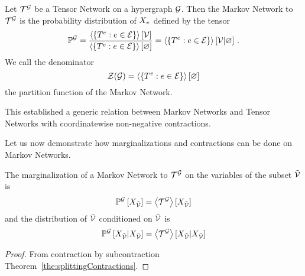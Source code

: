 \begin{definition}\label{def:markovNetwork}
	Let $\mathcal{T}^{\mathcal{G}}$ be a Tensor Network on a hypergraph $\mathcal{G}$.
	Then the Markov Network to $\mathcal{T}^{\mathcal{G}}$ is the probability distribution of $X_{v}$ defined by the tensor
		\[ \mathbb{P}^{\mathcal{G}} = \frac{
			\left\langle \{T^{e} : e \in \mathcal{E}\}\right\rangle \left[ \mathcal{V} \right] 
		}{
			\left\langle \{T^{e} : e \in \mathcal{E}\}\right\rangle \left[ \varnothing \right]
		} = \left\langle \{T^{e} : e \in \mathcal{E}\}\right\rangle \left[ \mathcal{V} | \varnothing \right] \, . \] 
	We call the denominator
		\[\mathcal{Z}{\left(\mathcal{G}\right)} = \left\langle \{T^{e} : e \in \mathcal{E}\}\right\rangle \left[ \varnothing \right] \]
	the partition function of the Markov Network.
\end{definition}

%
This established a generic relation between Markov Networks and Tensor Networks with coordinatewise non-negative contractions.

%


Let us now demonstrate how marginalizations and contractions can be done on Markov Networks.

\begin{theorem}
	The marginalization of a Markov Network to $\mathcal{T}^{\mathcal{G}}$ on the variables of the subset $\tilde{\mathcal{V}}$ is
	\[
		\mathbb{P}^{\mathcal{G}}\left[ X_{\tilde{\mathcal{V}}}\right] 
		= \left\langle \mathcal{T}^{\mathcal{G}}\right\rangle \left[ X_{\tilde{\mathcal{V}}} \right]
	\]
	and the distribution of $\tilde{\mathcal{V}}$ conditioned on $\bar{\mathcal{V}}$ is
	\[
		\mathbb{P}^{\mathcal{G}}\left[ X_{\tilde{\mathcal{V}}} | X_{\bar{\mathcal{V}}}\right] 
		= \left\langle \mathcal{T}^{\mathcal{G}}\right\rangle \left[ X_{\tilde{\mathcal{V}}} | X_{\bar{\mathcal{V}}} \right]
	\]
\end{theorem}
\begin{proof}
	From contraction by subcontraction Theorem~\ref{the:splittingContractions}.
\end{proof}



